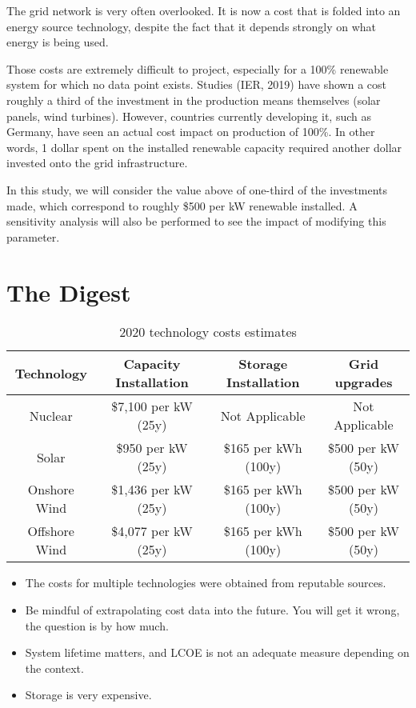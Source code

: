 The grid network is very often overlooked. It is now a cost that is folded into an energy source technology, despite the fact that it depends strongly on what energy is being used.

Those costs are extremely difficult to project, especially for a 100\% renewable system for which no data point exists. Studies (IER, 2019) have shown a cost roughly a third of the investment in the production means themselves (solar panels, wind turbines). However, countries currently developing it, such as Germany, have seen an actual cost impact on production of 100\%. In other words, 1 dollar spent on the installed renewable capacity required another dollar invested onto the grid infrastructure.

In this study, we will consider the value above of one-third of the investments made, which correspond to roughly \$500 per kW renewable installed. A sensitivity analysis will also be performed to see the impact of modifying this parameter.


\blindtext


\section{The Digest}



\begin{table*}[h]
\caption[2020 technology costs estimates]{2020 technology costs estimates}
\begin{tabular}{ c c c c }
	\toprule
	Technology & Capacity Installation & Storage Installation & Grid upgrades \\
	\midrule
	Nuclear & \$7,100 per kW (25y) & Not Applicable & Not Applicable\\
	Solar & \$950 per kW (25y) & \$165 per kWh (100y) & \$500 per kW (50y)\\
	Onshore Wind & \$1,436 per kW (25y) & \$165 per kWh (100y) & \$500 per kW (50y)\\
	Offshore Wind & \$4,077 per kW (25y) & \$165 per kWh (100y) & \$500 per kW (50y)\\
	\bottomrule
\end{tabular}

\end{table*}

\begin{kaoboxgreen}[frametitle=Main Takeaways]

\begin{itemize}
\item The costs for multiple technologies were obtained from reputable sources.
\item Be mindful of extrapolating cost data into the future. You will get it wrong, the question is by how much.
\item System lifetime matters, and LCOE is not an adequate measure depending on the context. 
\item Storage is very expensive.
\end{itemize}
  
\end{kaoboxgreen}


